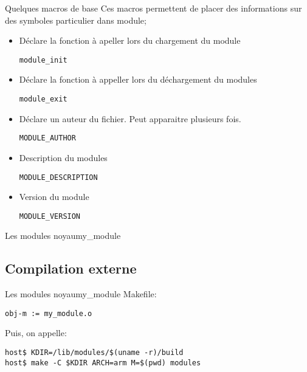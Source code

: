 \begin{frame}[fragile=singleslide]{Quelques macros de base}
  Ces macros  permettent de placer  des informations sur  des symboles
  particulier dans module;
  \begin{itemize} 
  \item Déclare la fonction à apeller lors du chargement du module
    \begin{lstlisting} 
module_init
    \end{lstlisting} 
  \item Déclare la fonction à appeller lors du déchargement du modules
    \begin{lstlisting} 
module_exit
    \end{lstlisting} 
  \item Déclare un auteur du fichier. Peut apparaitre plusieurs fois.
    \begin{lstlisting}
MODULE_AUTHOR
    \end{lstlisting}
  \item Description du modules
    \begin{lstlisting}
MODULE_DESCRIPTION
    \end{lstlisting}
  \item Version du module
    \begin{lstlisting}
MODULE_VERSION
    \end{lstlisting}
  \end{itemize}
\end{frame}

\begin{frame}[fragile=singleslide]{Les modules noyau}{my\_module}
  
\end{frame}


\subsection{Compilation externe}

\begin{frame}[fragile=singleslide]{Les modules noyau}{my\_module}
  Makefile:
  \begin{lstlisting}
obj-m := my_module.o  
  \end{lstlisting}
  Puis, on appelle:
  \begin{lstlisting}
host$ KDIR=/lib/modules/$(uname -r)/build
host$ make -C $KDIR ARCH=arm M=$(pwd) modules
  \end{lstlisting} %
\end{frame}

